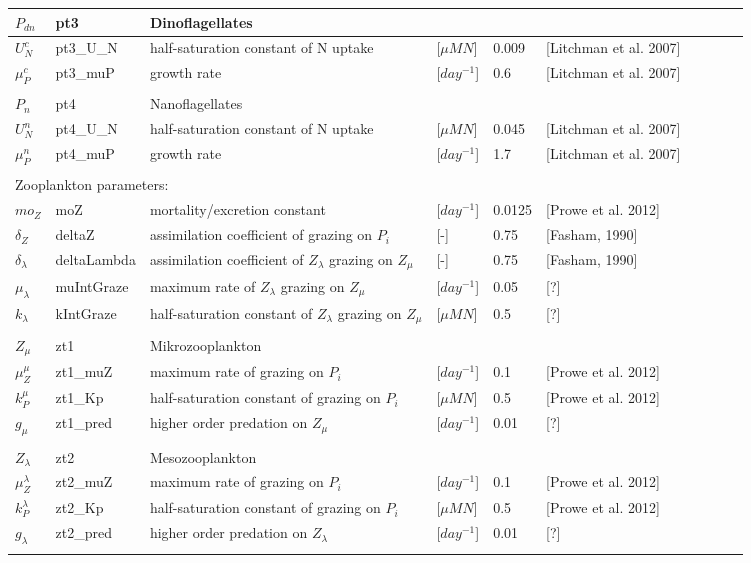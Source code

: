 \documentclass[11pt,letterpaper,english]{article}
\begin{document}
\begin{tabular}{llllllllll}
  \\
  $P_{dn}$ & pt3 & Dinoflagellates\\
  \hline
  $U^{c}_N$ & pt3\_U\_N & half-saturation constant of N uptake & [$\mu M N$]  &  0.009 & [Litchman et al. 2007]\\
  $\mu^{c}_P$ & pt3\_muP  & growth rate & [$day^{-1}$] & 0.6 & [Litchman et al. 2007]\\
  \\
  $P_{n}$ & pt4 & Nanoflagellates\\
  \hline
  $U^{n}_N$ & pt4\_U\_N & half-saturation constant of N uptake & [$\mu M N$]  &  0.045 & [Litchman et al. 2007]\\
  $\mu^{n}_P$ & pt4\_muP  & growth rate & [$day^{-1}$] & 1.7 & [Litchman et al. 2007]\\

  \\
  \hline
  \multicolumn{3}{l}{Zooplankton parameters:} \\
  \hline
  $mo_Z$ & moZ &  mortality/excretion constant & [$day^{-1}$] & 0.0125 & [Prowe et al. 2012]\\
  $\delta_Z$ & deltaZ & assimilation coefficient of grazing on $P_i$ & [-] & 0.75 & [Fasham, 1990]\\
  $\delta_{\lambda}$ & deltaLambda & assimilation coefficient of $Z_{\lambda}$ grazing on $Z_{\mu}$ & [-] & 0.75 & [Fasham, 1990]\\ 
  $\mu_{\lambda}$ & muIntGraze & maximum rate of $Z_{\lambda}$ grazing on $Z_{\mu}$ & [$day^{-1}$] & 0.05 & [?]\\
  $k_{\lambda}$ & kIntGraze & half-saturation constant of $Z_{\lambda}$ grazing on $Z_{\mu}$ & [$\mu M N$] & 0.5 & [?]\\ 
  \\
  $Z_{\mu}$ & zt1 & Mikrozooplankton\\
  \hline
  $\mu^{\mu}_Z$ & zt1\_muZ & maximum rate of grazing on $P_i$ & [$day^{-1}$] & 0.1 & [Prowe et al. 2012]\\ 
  $k^{\mu}_P$ & zt1\_Kp  & half-saturation constant of grazing on $P_i$ & [$\mu M N$] & 0.5 & [Prowe et al. 2012]\\
  $g_{\mu}$ & zt1\_pred & higher order predation on $Z_{\mu}$ & [$day^{-1}$] & 0.01 & [?]\\  
  \\
  $Z_{\lambda}$ & zt2 & Mesozooplankton\\
  \hline
  $\mu^{\lambda}_Z$ & zt2\_muZ & maximum rate of grazing on $P_i$ & [$day^{-1}$] & 0.1 & [Prowe et al. 2012]\\ 
  $k^{\lambda}_P$ & zt2\_Kp  & half-saturation constant of grazing on $P_i$ & [$\mu M N$] & 0.5 & [Prowe et al. 2012]\\
  $g_{\lambda}$ & zt2\_pred & higher order predation on $Z_{\lambda}$ & [$day^{-1}$] & 0.01 & [?]\\
  \\
  
  \hline
  \hline
\end{tabular}
\end{document}
